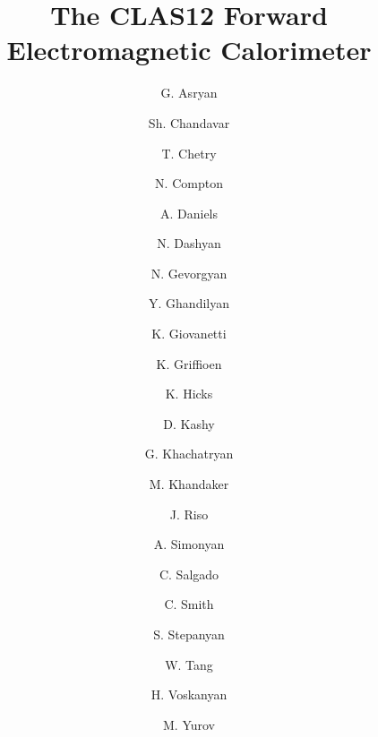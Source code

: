 \title{The CLAS12 Forward Electromagnetic Calorimeter}

\author[YerPi]{G. Asryan}
\author[Ohio]{Sh. Chandavar}
\author[Ohio]{T. Chetry}
\author[Ohio]{N. Compton}
\author[Ohio]{A. Daniels}
\author[YerPi]{N. Dashyan}
\author[YerPi]{N. Gevorgyan}
\author[YerPi]{Y. Ghandilyan}
\author[JMU]{K. Giovanetti}
\author[WmM]{K. Griffioen}
\author[Ohio]{K. Hicks}
\author[JLAB] {D. Kashy}
\author[YerPi]{G. Khachatryan}
\author[NSU]{M. Khandaker}
\author[WmM]{J. Riso}
\author[YerPi]{A. Simonyan}
\author[NSU] {C. Salgado}
\author[UVA]{C. Smith}
\author[JLAB]{S. Stepanyan}
\author[Ohio]{W. Tang}
\author[YerPi]{H. Voskanyan}
\author[KPook] {M. Yurov}

\address[JLAB]{Thomas Jefferson National Accelerator Facility, 
Newport News, VA 23606, USA}
\address[WmM]{The College of William and Mary, Williamsburg, VA 23185, USA}
\address[Ohio]{Ohio University, Athens, OH 45701, USA} 
\address[NSU] {Norfolk State University, Norfolk, VA 23504, USA}
\address[UVA]{University of Virginia, Charlottesville, VA 22901, USA}
\address[YerPi]{A. Alikhanyan National Science Laboratory,  Yerevan, 375036, Armenia}
\address[JMU]{James Madison University, Harrisonburg, VA 22807 , USA}
\address[KPook]{Kyungpook National University, Daegu 41566, Republic of Korea}

